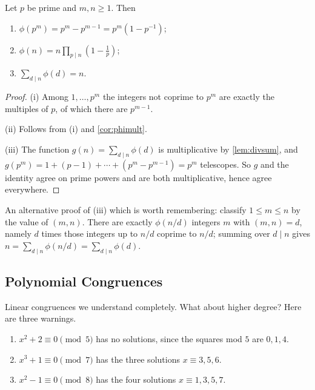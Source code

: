 \documentclass[a4paper]{scrartcl}
\begin{document}
\begin{theorem}\label{thm:phiformula}
	Let $p$ be prime and $m, n \geq 1$. Then
	\begin{enumerate}[label=(\roman*)]
		\item $\phi(p^m) = p^m - p^{m-1} = p^m(1 - p^{-1})$;
		\item $\phi(n) = n \prod_{p \mid n} \left(1 - \frac 1p\right)$;
		\item $\sum_{d \mid n} \phi(d) = n$.
	\end{enumerate}
\end{theorem}
\begin{proof}
	(i) Among $1, \dots, p^m$ the integers not coprime to $p^m$ are exactly the multiples of $p$, of which there are $p^{m-1}$.

	(ii) Follows from (i) and \autoref{cor:phimult}.

	(iii) The function $g(n) = \sum_{d \mid n} \phi(d)$ is multiplicative by \autoref{lem:divsum}, and $g(p^m) = 1 + (p - 1) + \cdots + (p^m - p^{m-1}) = p^m$ telescopes. So $g$ and the identity agree on prime powers and are both multiplicative, hence agree everywhere.
\end{proof}

An alternative proof of (iii) which is worth remembering: classify $1 \leq m \leq n$ by the value of $(m, n)$. There are exactly $\phi(n/d)$ integers $m$ with $(m,n) = d$, namely $d$ times those integers up to $n/d$ coprime to $n/d$; summing over $d \mid n$ gives $n = \sum_{d \mid n} \phi(n/d) = \sum_{d \mid n} \phi(d)$.

\subsection{Polynomial Congruences}

Linear congruences we understand completely. What about higher degree? Here are three warnings.

\begin{example}
	\begin{enumerate}[label=(\roman*)]
		\item $x^2 + 2 \equiv 0 \pmod 5$ has no solutions, since the squares mod $5$ are $0, 1, 4$.
		\item $x^3 + 1 \equiv 0 \pmod 7$ has the three solutions $x \equiv 3, 5, 6$.
		\item $x^2 - 1 \equiv 0 \pmod 8$ has the four solutions $x \equiv 1, 3, 5, 7$.
	\end{enumerate}
\end{example}
\end{document}
